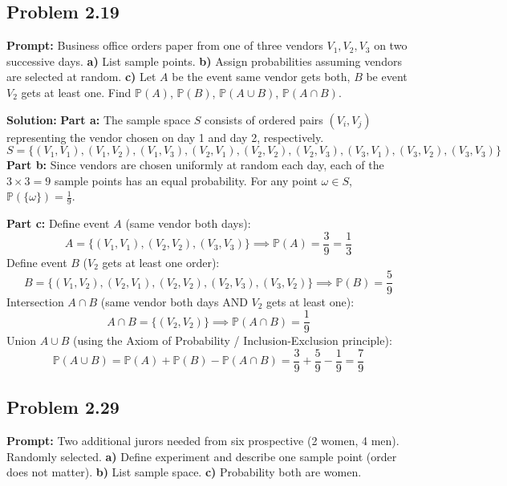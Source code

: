 \documentclass[11pt, letterpaper]{article}
\theoremstyle{definition}
\theoremstyle{remark}
\newcommand{\Prob}{\mathbb{P}}
\begin{document}
\subsection*{Problem 2.19}
\textbf{Prompt:} Business office orders paper from one of three vendors $V_{1}, V_{2}, V_{3}$ on two successive days.
\textbf{a)} List sample points.
\textbf{b)} Assign probabilities assuming vendors are selected at random.
\textbf{c)} Let $A$ be the event same vendor gets both, $B$ be event $V_{2}$ gets at least one. Find $\Prob(A)$, $\Prob(B)$, $\Prob(A \cup B)$, $\Prob(A \cap B)$.

\textbf{Solution:}
\textbf{Part a:} The sample space $S$ consists of ordered pairs $(V_{i}, V_{j})$ representing the vendor chosen on day 1 and day 2, respectively.
\[ S = \{(V_{1},V_{1}), (V_{1},V_{2}), (V_{1},V_{3}), (V_{2},V_{1}), (V_{2},V_{2}), (V_{2},V_{3}), (V_{3},V_{1}), (V_{3},V_{2}), (V_{3},V_{3})\} \]
\textbf{Part b:} Since vendors are chosen uniformly at random each day, each of the $3 \times 3 = 9$ sample points has an equal probability. For any point $\omega \in S$, $\Prob(\{\omega\}) = \frac{1}{9}$.

\textbf{Part c:}
Define event $A$ (same vendor both days):
\[ A = \{(V_{1},V_{1}), (V_{2},V_{2}), (V_{3},V_{3})\} \implies \Prob(A) = \frac{3}{9} = \frac{1}{3} \]
Define event $B$ ($V_{2}$ gets at least one order):
\[ B = \{(V_{1},V_{2}), (V_{2},V_{1}), (V_{2},V_{2}), (V_{2},V_{3}), (V_{3},V_{2})\} \implies \Prob(B) = \frac{5}{9} \]
Intersection $A \cap B$ (same vendor both days AND $V_{2}$ gets at least one):
\[ A \cap B = \{(V_{2},V_{2})\} \implies \Prob(A \cap B) = \frac{1}{9} \]
Union $A \cup B$ (using the Axiom of Probability / Inclusion-Exclusion principle):
\[ \Prob(A \cup B) = \Prob(A) + \Prob(B) - \Prob(A \cap B) = \frac{3}{9} + \frac{5}{9} - \frac{1}{9} = \frac{7}{9} \]

\subsection*{Problem 2.29}
\textbf{Prompt:} Two additional jurors needed from six prospective (2 women, 4 men). Randomly selected.
\textbf{a)} Define experiment and describe one sample point (order does not matter).
\textbf{b)} List sample space.
\textbf{c)} Probability both are women.
\end{document}
